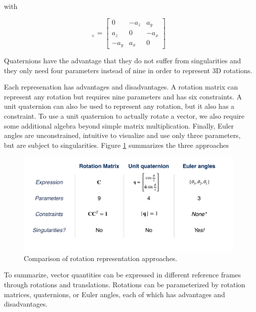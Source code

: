 with

\begin{equation}
[\mathbf{a}]_{\times} =
\begin{bmatrix}
0 & -a_z & a_y \\
a_z & 0 & -a_x \\
-a_y & a_x & 0
\end{bmatrix}
\end{equation}

Quaternions have the advantage that they do not suffer from singularities and they only need
four parameters instead of nine in order to represent 3D rotations. 



Each represenation has advantages and disadvantages. A rotation matrix can
represent any rotation but requires nine parameters
and has six constraints. A unit quaternion can also be
used to represent any rotation, but it also has a constraint. To use a unit quaternion to
actually rotate a vector, we also require some additional algebra beyond simple matrix multiplication. Finally, Euler angles are unconstrained, intuitive to visualize and
use only three parameters, but are subject to singularities. Figure \ref{coordinate_rotations_5} summarizes the three approaches

\begin{figure}[!htb]
\begin{center}
\includegraphics[scale=0.290]{img/coordinate_transforms/coordinate_rotations_5.jpeg}
\end{center}
\caption{Comparison of rotation representation approaches.}
\label{coordinate_rotations_5}
\end{figure}


To summarize, vector quantities can be expressed in different reference frames
through rotations and translations. Rotations can be parameterized
by rotation matrices, quaternions, or Euler angles, each of which has advantages
and disadvantages.
 
